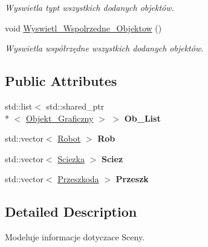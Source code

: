\begin{DoxyCompactItemize}
\begin{DoxyCompactList}\small\item\em Wyswietla typt wszystkich dodanych objektów. \end{DoxyCompactList}\item 
\hypertarget{class_scena_a59b56c90ca0e394cde1113706e66c551}{void \hyperlink{class_scena_a59b56c90ca0e394cde1113706e66c551}{Wyswietl\+\_\+\+Wspolrzedne\+\_\+\+Objektow} ()}\label{class_scena_a59b56c90ca0e394cde1113706e66c551}

\begin{DoxyCompactList}\small\item\em Wyswietla współrzędne wszystkich dodanych objektów. \end{DoxyCompactList}\end{DoxyCompactItemize}
\subsection*{Public Attributes}
\begin{DoxyCompactItemize}
\item 
\hypertarget{class_scena_a8e6cf035ed22edfe1ef9a097c8464204}{std\+::list$<$ std\+::shared\+\_\+ptr\\*
$<$ \hyperlink{class_objekt___graficzny}{Objekt\+\_\+\+Graficzny} $>$ $>$ {\bfseries Ob\+\_\+\+List}}\label{class_scena_a8e6cf035ed22edfe1ef9a097c8464204}

\item 
\hypertarget{class_scena_a19de28063043b979ed2483a3f50a02e2}{std\+::vector$<$ \hyperlink{class_robot}{Robot} $>$ {\bfseries Rob}}\label{class_scena_a19de28063043b979ed2483a3f50a02e2}

\item 
\hypertarget{class_scena_aefea7948629d50b33bef40650462c832}{std\+::vector$<$ \hyperlink{class_sciezka}{Sciezka} $>$ {\bfseries Sciez}}\label{class_scena_aefea7948629d50b33bef40650462c832}

\item 
\hypertarget{class_scena_a08e6af7098790bc02d1ff17ab2a0abe9}{std\+::vector$<$ \hyperlink{class_przeszkoda}{Przeszkoda} $>$ {\bfseries Przeszk}}\label{class_scena_a08e6af7098790bc02d1ff17ab2a0abe9}

\end{DoxyCompactItemize}


\subsection{Detailed Description}
Modeluje informacje dotyczace Sceny. 

